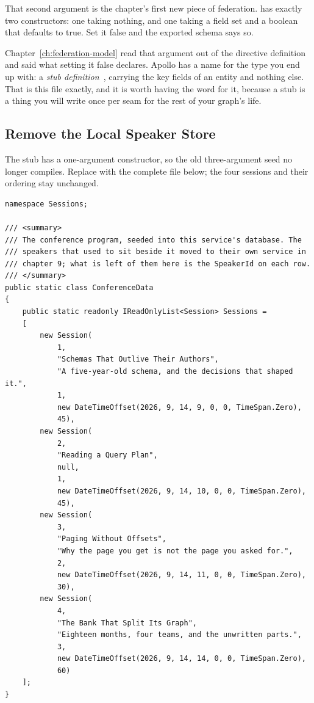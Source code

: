 %
That second argument is the chapter's first new piece of federation.
\code{[Key]} has exactly two constructors: one taking nothing, and one taking
a field set and a boolean that defaults to true. Set it false and the exported
schema says so.

%
Chapter~\ref{ch:federation-model} read that argument out of the directive
definition and said what setting it false declares. Apollo has a name for the
type you end up with: a \emph{stub
definition}~\autocite{apollocontributefields}, carrying the key fields of an
entity and nothing else. That is this file exactly, and it is worth having the
word for it, because a stub is a thing you will write once per seam for the
rest of your graph's life.

\subsection{Remove the Local Speaker Store}

The stub has a one-argument constructor, so the old three-argument seed no
longer compiles. Replace  with the complete file
below; the four sessions and their ordering stay unchanged.

\begin{verbatim}
namespace Sessions;

/// <summary>
/// The conference program, seeded into this service's database. The
/// speakers that used to sit beside it moved to their own service in
/// chapter 9; what is left of them here is the SpeakerId on each row.
/// </summary>
public static class ConferenceData
{
    public static readonly IReadOnlyList<Session> Sessions =
    [
        new Session(
            1,
            "Schemas That Outlive Their Authors",
            "A five-year-old schema, and the decisions that shaped it.",
            1,
            new DateTimeOffset(2026, 9, 14, 9, 0, 0, TimeSpan.Zero),
            45),
        new Session(
            2,
            "Reading a Query Plan",
            null,
            1,
            new DateTimeOffset(2026, 9, 14, 10, 0, 0, TimeSpan.Zero),
            45),
        new Session(
            3,
            "Paging Without Offsets",
            "Why the page you get is not the page you asked for.",
            2,
            new DateTimeOffset(2026, 9, 14, 11, 0, 0, TimeSpan.Zero),
            30),
        new Session(
            4,
            "The Bank That Split Its Graph",
            "Eighteen months, four teams, and the unwritten parts.",
            3,
            new DateTimeOffset(2026, 9, 14, 14, 0, 0, TimeSpan.Zero),
            60)
    ];
}
\end{verbatim}

